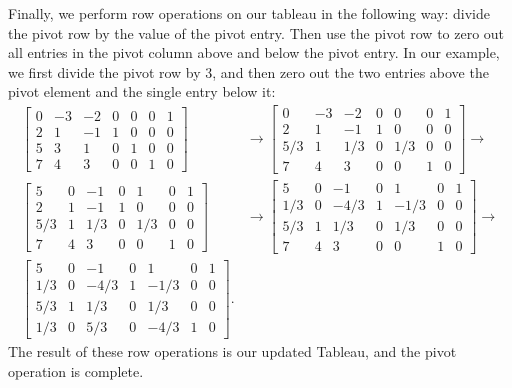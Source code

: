 Finally, we perform row operations on our tableau in the following way: divide the pivot row by the value of the pivot entry.
Then use the pivot row to zero out all entries in the pivot column above and below the pivot entry. In our example, we first divide
the pivot row by 3, and then zero out the two entries above the pivot element and the single entry below it:
\begin{align*}
\begin{bmatrix}
    0 & -3 & -2 & 0 & 0 & 0 & 1\\
    2 & 1 & -1 & 1 & 0 & 0 & 0\\
    5 & 3 & 1 & 0 & 1 & 0 & 0\\
    7 & 4 & 3 & 0 & 0 & 1 & 0
    \end{bmatrix} &\rightarrow
\begin{bmatrix}
    0 & -3 & -2 & 0 & 0 & 0 & 1\\
    2 & 1 & -1 & 1 & 0 & 0 & 0\\
    5/3 & 1 & 1/3 & 0 & 1/3 & 0 & 0\\
    7 & 4 & 3 & 0 & 0 & 1 & 0
    \end{bmatrix}\rightarrow\\
\begin{bmatrix}
    5 & 0 & -1 & 0 & 1 & 0 & 1\\
    2 & 1 & -1 & 1 & 0 & 0 & 0\\
    5/3 & 1 & 1/3 & 0 & 1/3 & 0 & 0\\
    7 & 4 & 3 & 0 & 0 & 1 & 0
    \end{bmatrix} &\rightarrow
\begin{bmatrix}
    5 & 0 & -1 & 0 & 1 & 0 & 1\\
    1/3 & 0 & -4/3 & 1 & -1/3 & 0 & 0\\
    5/3 & 1 & 1/3 & 0 & 1/3 & 0 & 0\\
    7 & 4 & 3 & 0 & 0 & 1 & 0
    \end{bmatrix}\rightarrow\\
\begin{bmatrix}
    5 & 0 & -1 & 0 & 1 & 0 & 1\\
    1/3 & 0 & -4/3 & 1 & -1/3 & 0 & 0\\
    5/3 & 1 & 1/3 & 0 & 1/3 & 0 & 0\\
    1/3 & 0 & 5/3 & 0 & -4/3 & 1 & 0
    \end{bmatrix}.
\end{align*}
The result of these row operations is our updated Tableau, and the pivot operation is complete.

